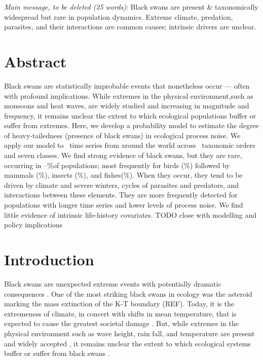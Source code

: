 
\noindent
\emph{Main message, to be deleted (25 words)}: Black swans are present \&
taxonomically widespread but rare in population dynamics. Extreme climate,
predation, parasites, and their interactions are common causes; intrinsic
drivers are unclear.

\section{Abstract}

Black swans are statistically improbable events that nonetheless occur ---
often with profound implications. While extremes in the physical
environment,such as monsoons and heat waves, are widely studied and increasing
in magnitude and frequency, it remains unclear the extent to which ecological
populations buffer or suffer from extremes. Here, we develop a probability
model to estimate the degree of heavy-tailedness (presence of black swans) in
ecological process noise. We apply our model to \NPops~time series from around
the world across \NOrders~taxonomic orders and seven classes. We find strong
evidence of black swans, but they are rare, occurring in
\overallMinPerc--\overallMaxPerc\%of populations; most frequently for birds
(\AvesRangePerc\%) followed by mammals (\MammaliaRangePerc\%), insects
(\InsectaRangePerc\%), and fishes(\OsteichthyesRangePerc\%). When they occur,
they tend to be driven by climate and severe winters, cycles of parasites and
predators, and interactions between these elements. They are more frequently
detected for populations with longer time series and lower levels of process
noise. We find little evidence of intrinsic life-history covariates. TODO close
with modelling and policy implications

\section{Introduction}

Black swans are unexpected extreme events with potentially dramatic consequences
\citep{taleb2007,sornette2009}. One of the most striking black swans in ecology
was the asteroid marking the mass extinction of the K-T boundary (REF). Today,
it is the extremeness of climate, in concert with shifts in mean temperature,
that is expected to cause the greatest societal damage \citep{ipcc2012}.
But, while extremes in the physical environment such as wave height, rain
fall, and temperature are present and widely accepted
\citep{gaines1993,katz2005}, it remains unclear the extent to which ecological
systems buffer or suffer from black swans \citep{nunez2012}.

